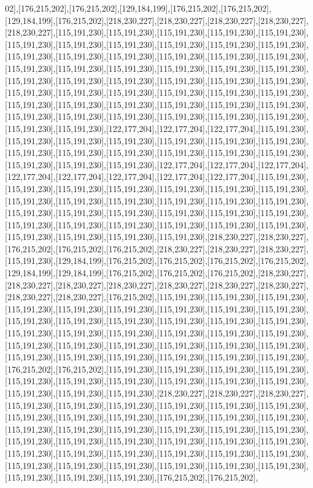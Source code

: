 02],[176,215,202],[176,215,202],[129,184,199],[176,215,202],[176,215,202],[129,184,199],[176,215,202],[218,230,227],[218,230,227],[218,230,227],[218,230,227],[218,230,227],[115,191,230],[115,191,230],[115,191,230],[115,191,230],[115,191,230],[115,191,230],[115,191,230],[115,191,230],[115,191,230],[115,191,230],[115,191,230],[115,191,230],[115,191,230],[115,191,230],[115,191,230],[115,191,230],[115,191,230],[115,191,230],[115,191,230],[115,191,230],[115,191,230],[115,191,230],[115,191,230],[115,191,230],[115,191,230],[115,191,230],[115,191,230],[115,191,230],[115,191,230],[115,191,230],[115,191,230],[115,191,230],[115,191,230],[115,191,230],[115,191,230],[115,191,230],[115,191,230],[115,191,230],[115,191,230],[115,191,230],[115,191,230],[115,191,230],[115,191,230],[115,191,230],[115,191,230],[115,191,230],[115,191,230],[115,191,230],[115,191,230],[122,177,204],[122,177,204],[122,177,204],[115,191,230],[115,191,230],[115,191,230],[115,191,230],[115,191,230],[115,191,230],[115,191,230],[115,191,230],[115,191,230],[115,191,230],[115,191,230],[115,191,230],[115,191,230],[115,191,230],[115,191,230],[115,191,230],[122,177,204],[122,177,204],[122,177,204],[122,177,204],[122,177,204],[122,177,204],[122,177,204],[122,177,204],[115,191,230],[115,191,230],[115,191,230],[115,191,230],[115,191,230],[115,191,230],[115,191,230],[115,191,230],[115,191,230],[115,191,230],[115,191,230],[115,191,230],[115,191,230],[115,191,230],[115,191,230],[115,191,230],[115,191,230],[115,191,230],[115,191,230],[115,191,230],[115,191,230],[115,191,230],[115,191,230],[115,191,230],[115,191,230],[115,191,230],[115,191,230],[115,191,230],[115,191,230],[218,230,227],[218,230,227],[176,215,202],[176,215,202],[176,215,202],[218,230,227],[218,230,227],[218,230,227],[115,191,230],[129,184,199],[176,215,202],[176,215,202],[176,215,202],[176,215,202],[129,184,199],[129,184,199],[176,215,202],[176,215,202],[176,215,202],[218,230,227],[218,230,227],[218,230,227],[218,230,227],[218,230,227],[218,230,227],[218,230,227],[218,230,227],[218,230,227],[176,215,202],[115,191,230],[115,191,230],[115,191,230],[115,191,230],[115,191,230],[115,191,230],[115,191,230],[115,191,230],[115,191,230],[115,191,230],[115,191,230],[115,191,230],[115,191,230],[115,191,230],[115,191,230],[115,191,230],[115,191,230],[115,191,230],[115,191,230],[115,191,230],[115,191,230],[115,191,230],[115,191,230],[115,191,230],[115,191,230],[115,191,230],[115,191,230],[115,191,230],[115,191,230],[115,191,230],[115,191,230],[115,191,230],[115,191,230],[176,215,202],[176,215,202],[115,191,230],[115,191,230],[115,191,230],[115,191,230],[115,191,230],[115,191,230],[115,191,230],[115,191,230],[115,191,230],[115,191,230],[115,191,230],[115,191,230],[115,191,230],[218,230,227],[218,230,227],[218,230,227],[115,191,230],[115,191,230],[115,191,230],[115,191,230],[115,191,230],[115,191,230],[115,191,230],[115,191,230],[115,191,230],[115,191,230],[115,191,230],[115,191,230],[115,191,230],[115,191,230],[115,191,230],[115,191,230],[115,191,230],[115,191,230],[115,191,230],[115,191,230],[115,191,230],[115,191,230],[115,191,230],[115,191,230],[115,191,230],[115,191,230],[115,191,230],[115,191,230],[115,191,230],[115,191,230],[115,191,230],[115,191,230],[115,191,230],[115,191,230],[115,191,230],[115,191,230],[115,191,230],[115,191,230],[115,191,230],[176,215,202],[176,215,202],